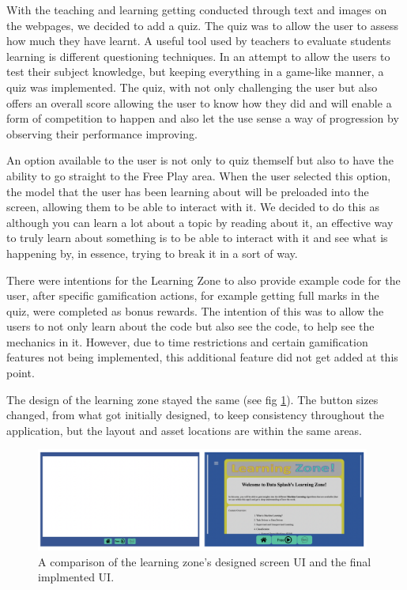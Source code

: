 	With the teaching and learning getting conducted through text and images on the webpages, we decided to add a quiz. The quiz was to allow the user to assess how much they have learnt. A useful tool used by teachers to evaluate students learning is different questioning techniques. In an attempt to allow the users to test their subject knowledge, but keeping everything in a game-like manner, a quiz was implemented. The quiz, with not only challenging the user but also offers an overall score allowing the user to know how they did and will enable a form of competition to happen and also let the use sense a way of progression by observing their performance improving.
	
	An option available to the user is not only to quiz themself but also to have the ability to go straight to the Free Play area. When the user selected this option, the model that the user has been learning about will be preloaded into the screen, allowing them to be able to interact with it. We decided to do this as although you can learn a lot about a topic by reading about it, an effective way to truly learn about something is to be able to interact with it and see what is happening by, in essence, trying to break it in a sort of way.
	
	There were intentions for the Learning Zone to also provide example code for the user, after specific gamification actions, for example getting full marks in the quiz, were completed as bonus rewards. The intention of this was to allow the users to not only learn about the code but also see the code, to help see the mechanics in it. However, due to time restrictions and certain gamification features not being implemented, this additional feature did not get added at this point.
	
	The design of the learning zone stayed the same (see fig \ref{fig:ui_lz}). The button sizes changed, from what got initially designed, to keep consistency throughout the application, but the layout and asset locations are within the same areas.
	
	\begin{figure}[t]
		\begin{center}
			\includegraphics[width=11cm]{graphics/learning_zone.png}
			\caption{A comparison of the learning zone's designed screen UI and the final implmented UI.}
			\label{fig:ui_lz}
		\end{center}
	\end{figure}
	
